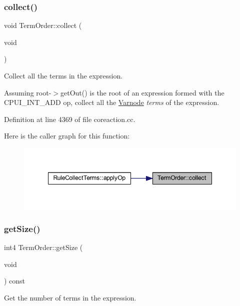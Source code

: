 \subsubsection{\texorpdfstring{collect()}{collect()}}
{\footnotesize\ttfamily void Term\+Order\+::collect (\begin{DoxyParamCaption}\item[{void}]{ }\end{DoxyParamCaption})}



Collect all the terms in the expression. 

Assuming root-\/$>$get\+Out() is the root of an expression formed with the C\+P\+U\+I\+\_\+\+I\+N\+T\+\_\+\+A\+DD op, collect all the \mbox{\hyperlink{class_varnode}{Varnode}} {\itshape terms} of the expression. 

Definition at line 4369 of file coreaction.\+cc.

Here is the caller graph for this function\+:
\nopagebreak
\begin{figure}[H]
\begin{center}
\leavevmode
\includegraphics[width=348pt]{class_term_order_aa9539a5ed4aa2029cf780dbd18db4370_icgraph}
\end{center}
\end{figure}
\mbox{\label{class_term_order_a80c74328029feca80764dd5daf77332f}} 
\subsubsection{\texorpdfstring{getSize()}{getSize()}}
{\footnotesize\ttfamily int4 Term\+Order\+::get\+Size (\begin{DoxyParamCaption}\item[{void}]{ }\end{DoxyParamCaption}) const\hspace{0.3cm}{\ttfamily [inline]}}



Get the number of terms in the expression. 



